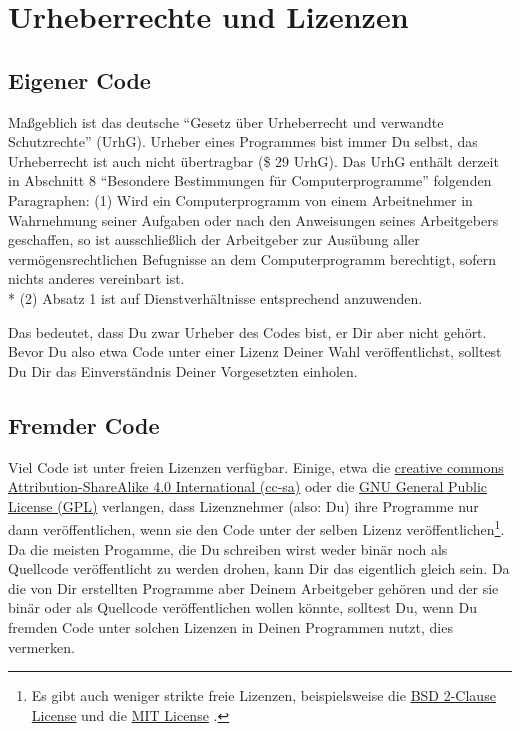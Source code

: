 \documentclass[twoside]{scrreprt}
\begin{document}
\section{Urheberrechte und Lizenzen}
\subsection{Eigener Code}
Ma\ss{}geblich ist das deutsche "`Gesetz \"u{}ber Urheberrecht und verwandte
Schutzrechte"' (UrhG). 
Urheber eines Programmes bist immer Du selbst, das Urheberrecht ist auch nicht
\"u{}bertragbar (\$ 29 UrhG).
Das UrhG enth\"a{}lt derzeit in Abschnitt 8 "`Besondere Bestimmungen
f\"u{}r 
Computerprogramme"' folgenden Paragraphen:
(1) Wird ein Computerprogramm von einem Arbeitnehmer in Wahrnehmung seiner
Aufgaben oder nach den Anweisungen seines Arbeitgebers geschaffen, so ist
ausschlie\ss{}lich der Arbeitgeber zur Aus\"u{}bung aller 
verm\"o{}gensrechtlichen Befugnisse an dem Computerprogramm berechtigt, sofern 
nichts anderes vereinbart ist.\\*
(2) Absatz 1 ist auf Dienstverh\"a{}ltnisse entsprechend anzuwenden.

Das bedeutet, dass Du zwar Urheber des Codes bist, er Dir aber nicht
geh\"o{}rt. Bevor Du also etwa Code unter einer Lizenz Deiner Wahl
ver\"o{}ffentlichst, solltest Du Dir das Einverst\"a{}ndnis Deiner Vorgesetzten 
einholen.

\subsection{Fremder Code\label{sec:copy_foreign}}
Viel Code ist unter freien Lizenzen verf\"u{}gbar. Einige, etwa die
\linebreak{}
\href{https://creativecommons.org/licenses/by-sa/4.0/legalcode}{creative commons
Attribution-ShareAlike 4.0 International (cc-sa)} oder die
\linebreak{}
\href{http://www.gnu.org/licenses/gpl-3.0.html}{GNU General Public License
(GPL)} verlangen, dass Lizenznehmer (also: Du) ihre Programme nur dann
ver\"o{}ffentlichen, wenn sie den Code unter der selben Lizenz
ver\"o{}ffentlichen\footnote{Es gibt auch weniger strikte freie Lizenzen,
beispielsweise die 
\href{http://opensource.org/licenses/BSD-2-Clause}{BSD 2-Clause License} und
die 
\href{http://opensource.org/licenses/MIT}{MIT License}%
. }.
Da die meisten Progamme, die Du schreiben wirst weder bin\"a{}r noch als
Quellcode ver\"o{}ffentlicht zu werden drohen, kann Dir das eigentlich gleich 
sein.
Da die von Dir erstellten Programme aber Deinem Arbeitgeber geh\"o{}ren und der
sie bin\"a{}r oder als Quellcode ver\"o{}ffentlichen wollen  k\"o{}nnte, 
solltest Du, wenn Du fremden Code unter solchen Lizenzen in Deinen Programmen
nutzt, dies vermerken.
\end{document}
